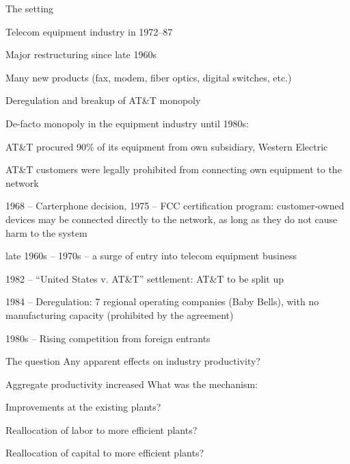 \begin{frame}{The setting}
	\bi
		\item{}Telecom equipment industry in 1972--87
		\item{}Major restructuring since late 1960s
		\bi
			\item{Many new products (fax, modem, fiber optics, digital switches, etc.)}
			\item{Deregulation and breakup of AT\&T monopoly}
		\ei
		\item{}De-facto monopoly in the equipment industry until 1980s:
		\bi
			\item{AT\&T procured 90\% of its equipment from own subsidiary, Western Electric}
			\item{AT\&T customers were legally prohibited from connecting own equipment to the network}
		\ei
	\ei
	
\end{frame}

\begin{frame}
	\bi
		\item{}1968 -- Carterphone decision, 1975 -- FCC certification program: customer-owned devices may be connected directly to the network, as long as they do not cause harm to the system
		\item{late 1960s -- 1970s -- a surge of entry into telecom equipment business}
		\item{}1982 -- ``United States v. AT\&T'' settlement: AT\&T to be split up
		\item{}1984 -- Deregulation: 7 regional operating companies (Baby Bells), with no manufacturing capacity (prohibited by the agreement)
		\item{1980s -- Rising competition from foreign entrants}
	\ei
\end{frame}

\begin{frame}{The question}
	Any apparent effects on industry productivity?
	\bi
		\item{}Aggregate productivity increased
	\ei
	What was the mechanism:
	\bi
		\item{}Improvements at the existing plants?
		\item{}Reallocation of labor to more efficient plants?
		\item{}Reallocation of capital to more efficient plants?
	\ei
\end{frame}

